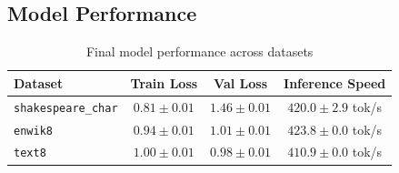 \documentclass{article} %
\begin{document}
\subsection{Model Performance}
\begin{table}[h]
\centering
\caption{Final model performance across datasets}
\begin{tabular}{lccc}
\toprule
Dataset & Train Loss & Val Loss & Inference Speed \\
\midrule
\texttt{shakespeare\_char} & $0.81 \pm 0.01$ & $1.46 \pm 0.01$ & $420.0 \pm 2.9$ tok/s \\
\texttt{enwik8} & $0.94 \pm 0.01$ & $1.01 \pm 0.01$ & $423.8 \pm 0.0$ tok/s \\
\texttt{text8} & $1.00 \pm 0.01$ & $0.98 \pm 0.01$ & $410.9 \pm 0.0$ tok/s \\
\bottomrule
\end{tabular}
\label{tab:performance}
\end{table}
\end{document}
